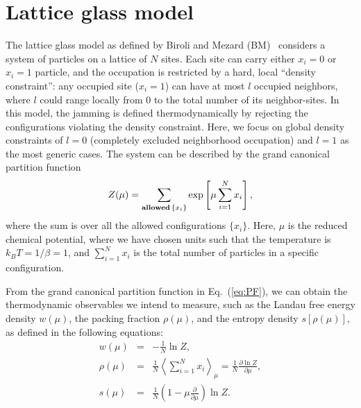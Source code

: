 

\section{Lattice glass model}
\label{sec:jam_model}

The lattice glass model as defined by
Biroli and Mezard (BM)~\cite{Biroli02} considers a system of particles
on a lattice of $N$ sites. Each site can carry either $x_{i}=0$
or $x_{i}=1$ particle, and the occupation is restricted by a hard,
local ``density constraint'': any occupied site ($x_{i}=1$) can
have at most $l$ occupied neighbors, where $l$ could range locally
from 0 to the total number of its neighbor-sites. In this model, the
jamming is defined thermodynamically by rejecting the configurations
violating the density constraint. Here, we focus on global density
constraints of $l=0$ (completely excluded neighborhood occupation)
and $l=1$ as the most generic cases. The system can be described
by the grand canonical partition function 
\begin{equation}
Z(\mu)=\sum_{{\bf allowed}\,\{x_{i}\}}\exp\left[\mu\sum_{i=1}^{N}x_{i}\right],\label{eq:PF}
\end{equation}
where the sum is over all the allowed configurations $\{x_{i}\}$.
Here, $\mu$ is the reduced chemical potential, where we have chosen
units such that the temperature is $k_{B}T=1/\beta=1$, and $\sum_{i=1}^{N}x_{i}$
is the total number of particles in a specific configuration.

From the grand canonical partition function in Eq.~(\ref{eq:PF}),
we can obtain the thermodynamic observables we intend to measure,
such as the Landau free energy density $w(\mu)$, the packing fraction
$\rho(\mu)$, and the entropy density $s\left[\rho(\mu)\right]$,
as defined in the following equations:
\begin{eqnarray}
w(\mu) & = & -\frac{1}{N}\ln Z,\label{eq:GCPdiff}\\
\rho(\mu) & = & \frac{1}{N}\left<\sum_{i=1}^{N}x_{i}\right>_{\mu}=\frac{1}{N}\frac{\partial\ln Z}{\partial\mu},\nonumber \\
s(\mu) & = & \frac{1}{N}\left(1-\mu\frac{\partial}{\partial\mu}\right)\ln Z.\nonumber 
\end{eqnarray}
 
